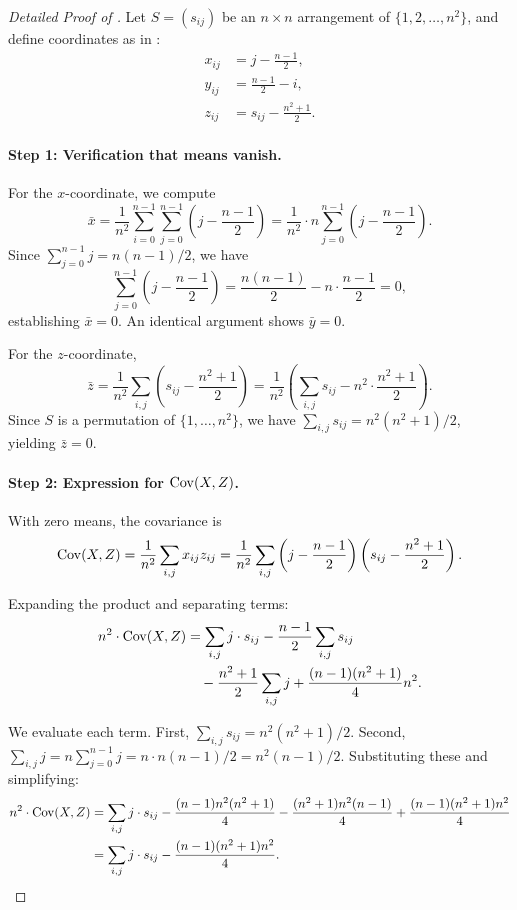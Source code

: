 \begin{proof}[Detailed Proof of ]
Let $S = (s_{ij})$ be an $n \times n$ arrangement of $\{1, 2, \ldots, n^2\}$,
and define coordinates as in :
\begin{align*}
x_{ij} &= j - \frac{n-1}{2}, \\
y_{ij} &= \frac{n-1}{2} - i, \\
z_{ij} &= s_{ij} - \frac{n^2+1}{2}.
\end{align*}

\paragraph{Step 1: Verification that means vanish.}
For the $x$-coordinate, we compute
\[
\bar{x} = \frac{1}{n^2} \sum_{i=0}^{n-1} \sum_{j=0}^{n-1} \left( j - \frac{n-1}{2} \right)
= \frac{1}{n^2} \cdot n \sum_{j=0}^{n-1} \left( j - \frac{n-1}{2} \right).
\]
Since $\sum_{j=0}^{n-1} j = n(n-1)/2$, we have
\[
\sum_{j=0}^{n-1} \left( j - \frac{n-1}{2} \right) = \frac{n(n-1)}{2} - n \cdot \frac{n-1}{2} = 0,
\]
establishing $\bar{x} = 0$. An identical argument shows $\bar{y} = 0$.

For the $z$-coordinate,
\[
\bar{z} = \frac{1}{n^2} \sum_{i,j} \left( s_{ij} - \frac{n^2+1}{2} \right)
= \frac{1}{n^2} \left( \sum_{i,j} s_{ij} - n^2 \cdot \frac{n^2+1}{2} \right).
\]
Since $S$ is a permutation of $\{1, \ldots, n^2\}$, we have $\sum_{i,j} s_{ij} = n^2(n^2+1)/2$,
yielding $\bar{z} = 0$.

\paragraph{Step 2: Expression for $\mathrm{Cov}(X, Z)$.}
With zero means, the covariance is
\[
\mathrm{Cov}(X, Z) = \frac{1}{n^2} \sum_{i,j} x_{ij} z_{ij}
= \frac{1}{n^2} \sum_{i,j} \left( j - \frac{n-1}{2} \right) \left( s_{ij} - \frac{n^2+1}{2} \right).
\]

Expanding the product and separating terms:
\begin{align*}
n^2 \cdot \mathrm{Cov}(X, Z) &= \sum_{i,j} j \cdot s_{ij} 
- \frac{n-1}{2} \sum_{i,j} s_{ij} \\
&\quad - \frac{n^2+1}{2} \sum_{i,j} j 
+ \frac{(n-1)(n^2+1)}{4} n^2.
\end{align*}

We evaluate each term. First, $\sum_{i,j} s_{ij} = n^2(n^2+1)/2$.
Second, $\sum_{i,j} j = n \sum_{j=0}^{n-1} j = n \cdot n(n-1)/2 = n^2(n-1)/2$.
Substituting these and simplifying:
\begin{align*}
n^2 \cdot \mathrm{Cov}(X, Z) &= \sum_{i,j} j \cdot s_{ij} 
- \frac{(n-1) n^2 (n^2+1)}{4} 
- \frac{(n^2+1) n^2 (n-1)}{4} 
+ \frac{(n-1)(n^2+1) n^2}{4} \\
&= \sum_{i,j} j \cdot s_{ij} - \frac{(n-1)(n^2+1) n^2}{4}.
\end{align*}


\end{proof}
